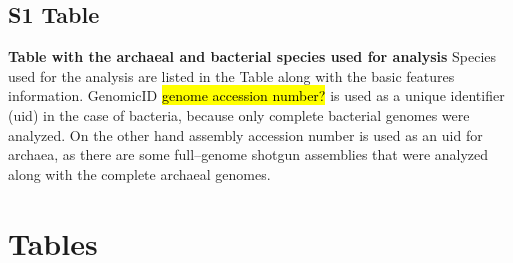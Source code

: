 \documentclass[10pt,letterpaper]{article}
\begin{document}

\subsection*{S1 Table}
\label{table:s1}
{\bf Table with the archaeal and bacterial species used for analysis}
Species used for the analysis are listed in the Table along with the basic features information.
GenomicID \hl{genome accession number?} is used as a unique identifier (uid) in the case of bacteria, because only complete bacterial genomes were analyzed. On the other hand assembly accession number is used as an uid for archaea, as there are some full--genome shotgun assemblies that were analyzed along with the complete archaeal genomes.



\section*{Tables}
% 
%
%
\end{document}
